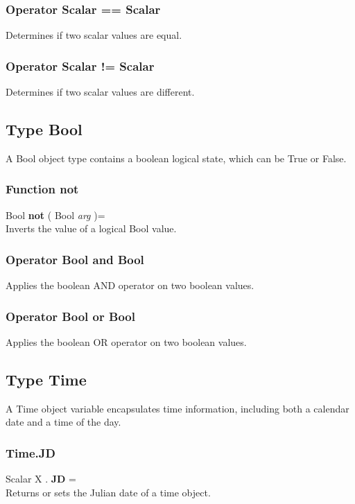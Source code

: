 \documentclass[10pt]{book}
\begin{document}
\subsubsection{Operator Scalar == Scalar \label{O:Scalar==Scalar}}
Determines if two scalar values are equal.

\subsubsection{Operator Scalar != Scalar \label{O:Scalar!=Scalar}}
Determines if two scalar values are different.

\subsection{Type Bool \label{T:Bool}}
A Bool object type contains a boolean logical state, which can be True or False.

\subsubsection{Function not \label{F:not}}
Bool \textbf{not} ( Bool \textit{arg} )= \\
Inverts the value of a logical Bool value.

\subsubsection{Operator Bool  and  Bool \label{O:Bool and Bool}}
Applies the boolean AND operator on two boolean values.

\subsubsection{Operator Bool  or  Bool \label{O:Bool or Bool}}
Applies the boolean OR operator on two boolean values.

\subsection{Type Time \label{T:Time}}
A Time object variable encapsulates time information, including both a calendar date and a time of the day.

\subsubsection{Time.JD \label{F:Time:JD}}
Scalar X . \textbf{JD} = \\
Returns or sets the Julian date of a time object.
\end{document}
